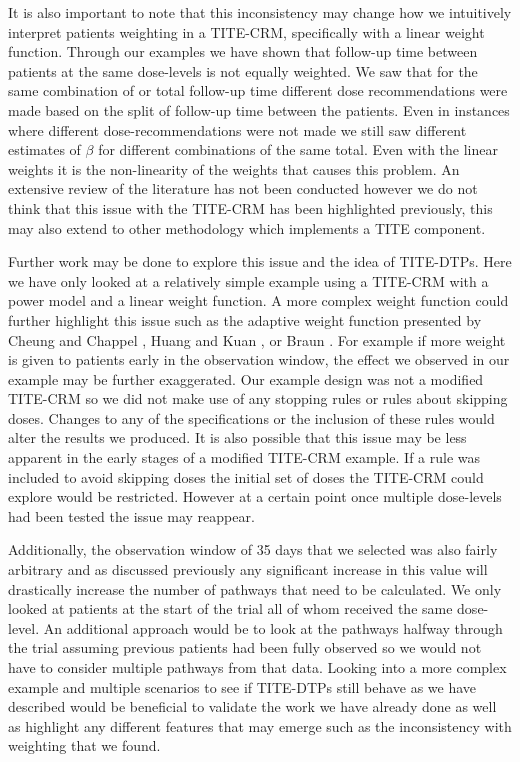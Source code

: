 It is also important to note that this inconsistency may change how we intuitively interpret patients weighting in a TITE-CRM, specifically with a linear weight function. Through our examples we have shown that follow-up time between patients at the same dose-levels is not equally weighted. We saw that for the same combination of or total follow-up time different dose recommendations were made based on the split of follow-up time between the patients. Even in instances where different dose-recommendations were not made we still saw different estimates of $\beta$ for different combinations of the same total. Even with the linear weights it is the non-linearity of the weights that causes this problem. An extensive review of the literature has not been conducted however we do not think that this issue with the TITE-CRM has been highlighted previously, this may also extend to other methodology which implements a TITE component. 

Further work may be done to explore this issue and the idea of TITE-DTPs. Here we have only looked at a relatively simple example using a TITE-CRM with a power model and a linear weight function. A more complex weight function could further highlight this issue such as the adaptive weight function presented by Cheung and Chappel \cite{cheungSequentialDesignsPhase2000}, Huang and Kuan \cite{huangTimetoeventContinualReassessment2014}, or Braun \cite{braunGeneralizingTITECRMAdapt2006}. For example if more weight is given to patients early in the observation window, the effect we observed in our example may be further exaggerated. Our example design was not a modified TITE-CRM so we did not make use of any stopping rules or rules about skipping doses. Changes to any of the specifications or the inclusion of these rules would alter the results we produced. It is also possible that this issue may be less apparent in the early stages of a modified TITE-CRM example. If a rule was included to avoid skipping doses the initial set of doses the TITE-CRM could explore would be restricted. However at a certain point once multiple dose-levels had been tested the issue may reappear.

Additionally, the observation window of 35 days that we selected was also fairly arbitrary and as discussed previously any significant increase in this value will drastically increase the number of pathways that need to be calculated. We only looked at patients at the start of the trial all of whom received the same dose-level. An additional approach would be to look at the pathways halfway through the trial assuming previous patients had been fully observed so we would not have to consider multiple pathways from that data. Looking into a more complex example and multiple scenarios to see if TITE-DTPs still behave as we have described would be beneficial to validate the work we have already done as well as highlight any different features that may emerge such as the inconsistency with weighting that we found.

